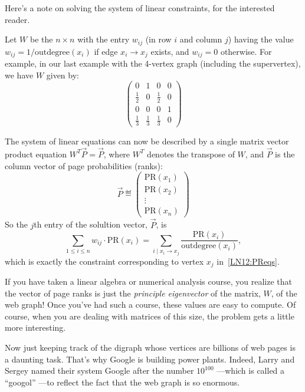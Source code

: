 \begin{editingnotes}
Here's a note on solving the system of linear constraints, for the
interested reader.

Let $W$ be the $n \times n$ with the entry $w_{ij}$ (in row $i$ and
column $j$) having the value $w_{ij} = 1/\text{outdegree}(x_i)$ if edge
$x_i \rightarrow x_j$ exists, and $w_{ij} = 0$ otherwise.  For example, in
our last example with the 4-vertex graph (including the supervertex), we have
$W$ given by:
\[
\left( \begin{array}{cccc}
    0 & 1 & 0 & 0 \\
    \frac{1}{2} & 0 & \frac{1}{2} & 0 \\
    0 & 0 & 0 & 1\\
    \frac{1}{3} & \frac{1}{3} & \frac{1}{3} & 0 \end{array} \right)
\]

The system of linear equations can now be described by a single matrix
vector product equation $W^T \vec{P} = \vec{P}$, where $W^T$ denotes the
transpose of $W$, and $\vec{P}$ is the column vector of page probabilities
(ranks):
\[\vec{P}\eqdef
\left( \begin{array}{c}
    \text{PR}(x_1) \\
    \text{PR}(x_2) \\
    \vdots \\
    \text{PR}(x_n) \end{array} \right)
\]
So the $j$th entry of the solultion vector, $\vec{P}$, is
\[
\sum_{1\leq i \leq n} w_{ij} \cdot \text{PR}(x_i) =
\sum_{i \mid x_i \rightarrow x_j} \frac{\text{PR}(x_i)}{\text{outdegree}(x_i)},
\]
which is exactly the constraint corresponding to vertex $x_j$
in~\eqref{LN12:PReqs}.

If you have taken a linear algebra or numerical analysis course, you
realize that the vector of page ranks is just the \emph{principle
  eigenvector} of the matrix, $W$, of the web graph!  Once you've had such
a course, these values are easy to compute.  Of course, when you are
dealing with matrices of this size, the problem gets a little more
interesting.

\end{editingnotes}

Now just keeping track of the digraph whose vertices are billions of
web pages is a daunting task.  That's why Google is building power
plants.  Indeed, Larry and Sergey named their system Google after the
number $10^{100}$ ---which is called a ``googol'' ---to reflect the
fact that the web graph is so enormous.

